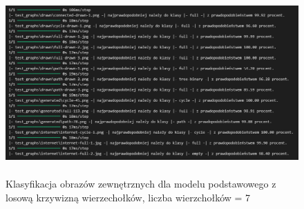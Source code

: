 \begin{figure}[ht]
	\centering
	\includegraphics[height=7cm]{resources/tests/images/v3/base7_txt.png}
	\caption{Klasyfikacja obrazów zewnętrznych dla modelu podstawowego z losową krzywizną wierzechołków, liczba wierzchołków = 7}
	\label{Fig:tests-base-2}
\end{figure}
\FloatBarrier